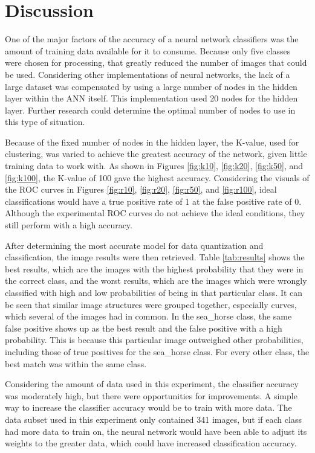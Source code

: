 \documentclass{article}
\begin{document}
\section{Discussion}
\label{sec:discussion}
One of the major factors of the accuracy of a neural network classifiers was the amount of training data available for it to consume. Because only five classes were chosen for processing, that greatly reduced the number of images that could be used. Considering other implementations of neural networks, the lack of a large dataset was compensated by using a large number of nodes in the hidden layer within the ANN itself. This implementation used 20 nodes for the hidden layer. Further research could determine the optimal number of nodes to use in this type of situation. 

Because of the fixed number of nodes in the hidden layer, the K-value, used for clustering, was varied to achieve the greatest accuracy of the network, given little training data to work with. As shown in Figures \ref{fig:k10}, \ref{fig:k20}, \ref{fig:k50}, and \ref{fig:k100}, the K-value of 100 gave the highest accuracy. Considering the visuals of the ROC curves in Figures \ref{fig:r10}, \ref{fig:r20}, \ref{fig:r50}, and \ref{fig:r100}, ideal classifications would have a true positive rate of 1 at the false positive rate of 0. Although the experimental ROC curves do not achieve the ideal conditions, they still perform with a high accuracy.

After determining the most accurate model for data quantization and classification, the image results were then retrieved. Table \ref{tab:results} shows the best results, which are the images with the highest probability that they were in the correct class, and the worst results, which are the images which were wrongly classified with high and low probabilities of being in that particular class. It can be seen that similar image structures were grouped together, especially curves, which several of the images had in common. In the sea\_horse class, the same false positive shows up as the best result and the false positive with a high probability. This is because this particular image outweighed other probabilities, including those of true positives for the sea\_horse class. For every other class, the best match was within the same class.

Considering the amount of data used in this experiment, the classifier accuracy was moderately high, but there were opportunities for improvements. A simple way to increase the classifier accuracy would be to train with more data. The data subset used in this experiment only contained 341 images, but if each class had more data to train on, the neural network would have been able to adjust its weights to the greater data, which could have increased classification accuracy.
\end{document}
